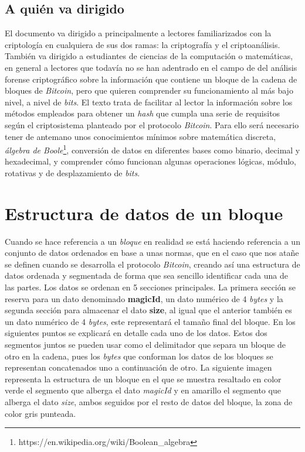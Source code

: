 \documentclass{article}
\begin{document}
    \subsection{A quién va dirigido}
    El documento va dirigido a principalmente a lectores familiarizados con la criptología en cualquiera de sus dos ramas: la criptografía y el criptoanálisis. También va dirigido a estudiantes de ciencias de la computación o matemáticas, en general a lectores que todavía no se han adentrado en el campo de del análisis forense criptográfico sobre la información que contiene un bloque de la cadena de bloques de \textit{Bitcoin}, pero que quieren comprender su funcionamiento al más bajo nivel, a nivel de \textit{bits}. El texto trata de facilitar al lector la información sobre los métodos empleados para obtener un \textit{hash} que cumpla una serie de requisitos según el criptosistema planteado por el protocolo \textit{Bitcoin}. Para ello será necesario tener de antemano unos conocimientos mínimos sobre matemática discreta, \textit{álgebra de Boole}\footnote{https://en.wikipedia.org/wiki/Boolean\_algebra}, conversión de datos en diferentes bases como binario, decimal y hexadecimal, y comprender cómo funcionan algunas operaciones lógicas, módulo, rotativas y de desplazamiento de \textit{bits}.

\section{Estructura de datos de un bloque}
    
    \vspace{3mm}
    
    Cuando se hace referencia a un \textit{bloque} en realidad se está haciendo referencia a un conjunto de datos ordenados en base a unas normas, que en el caso que nos atañe se definen cuando se desarrolla el protocolo \textit{Bitcoin}, creando así una estructura de datos ordenada y segmentada de forma que sea sencillo identificar cada una de las partes. Los datos se ordenan en 5 secciones principales. La primera sección se reserva para un dato denominado \textbf{magicId}, un dato numérico de 4 \textit{bytes} y la segunda sección para almacenar el dato \textbf{size}, al igual que el anterior también es un dato numérico de 4 \textit{bytes}, este representará el tamaño final del bloque. En los siguientes puntos se explicará en detalle cada uno de los datos. Estos dos segmentos juntos se pueden usar como el delimitador que separa un bloque de otro en la cadena, pues los \textit{bytes} que conforman los datos de los bloques se representan concatenados uno a continuación de otro. La siguiente imagen representa la estructura de un bloque en el que se muestra resaltado en color verde el segmento que alberga el dato \textit{magicId} y en amarillo el segmento que alberga el dato \textit{size}, ambos seguidos por el resto de datos del bloque, la zona de color gris punteada.
    
\end{document}
